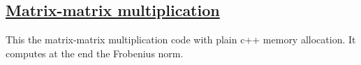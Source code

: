 \subsection*{\href{{https://github.com/CompPhysics/ComputationalPhysicsMSU/blob/master/doc/Programs/LecturePrograms/programs/Classes/cpp/program9.cpp}}{Matrix-matrix multiplication}}
This the matrix-matrix multiplication code with plain c++ memory allocation. It computes at the end the Frobenius norm.



































































